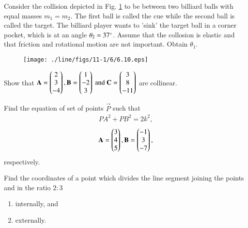 \item Consider the collision depicted in Fig. \ref{fig:6.10} to be between two billiard balls with equal masses $m_1= m_2$.  The first ball is called the cue while the second ball is called the target. The billiard player wants to 'sink' the target ball in a corner pocket, which is at an angle $\theta_2=37\degree$.  Assume that the collosion
is elastic and that friction and rotational motion are not important. Obtain $\theta_1$.
\begin{figure}[!ht]
\centering
\texttt{[image: ./line/figs/11-1/6/6.10.eps]}
\caption{}
\label{fig:6.10}
\end{figure}
\item Show that 
$
\mathbf{A}=\begin{pmatrix}2\\3\\-4\end{pmatrix}, 
\mathbf{B}=\begin{pmatrix}1\\-2\\3\end{pmatrix} \text{ and } 
\mathbf{C}=\begin{pmatrix}3\\8\\-11\end{pmatrix}$  
are collinear.
\\
\solution 
%

\item Find the equation of set of points $\vec{P}$ such that
\begin{align}
PA^2+PB^2 =2k^2,
\end{align}
%
\begin{align}
\mathbf{A} = \begin{pmatrix}3\\4 \\5\end{pmatrix},
\mathbf{B} = \begin{pmatrix}-1\\3 \\-7\end{pmatrix},
\end{align}
%
respectively.
%
\item Find the coordinates of a point which divides the line segment joining the points  and  in the ratio $2:3$
\begin{enumerate}
\item internally, and
\item externally.
\end{enumerate}
%
\solution


